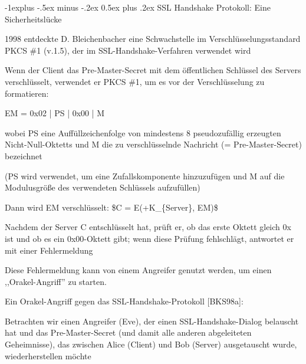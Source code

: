 \documentclass[a4paper]{article}
\makeatletter
\renewcommand{\subsection}{\@startsection{subsection}{2}{0mm}%
 {-1explus -.5ex minus -.2ex}%
 {0.5ex plus .2ex}%
 {\normalfont\normalsize\bfseries}}
\makeatother
\begin{document}
\begin{multicols}{3}
\begin{itemize*}
            \subsection{SSL Handshake Protokoll: Eine
                  Sicherheitslücke}
            \begin{itemize*}
                  \item       1998 entdeckte D. Bleichenbacher eine Schwachstelle im
                  Verschlüsselungsstandard PKCS \#1 (v.1.5), der im
                  SSL-Handshake-Verfahren verwendet wird
                  \item       Wenn der Client das Pre-Master-Secret mit dem öffentlichen Schlüssel
                  des Servers verschlüsselt, verwendet er PKCS \#1, um es vor der
                  Verschlüsselung zu formatieren:
                  \begin{itemize*}
                        \item EM = 0x02 | PS | 0x00 | M
                        \begin{itemize*} \item wobei PS eine Auffüllzeichenfolge von mindestens 8 pseudozufällig erzeugten Nicht-Null-Oktetts und M die zu verschlüsselnde Nachricht (= Pre-Master-Secret) bezeichnet \item (PS wird verwendet, um eine Zufallskomponente hinzuzufügen und M auf die Modulusgröße des verwendeten Schlüssels aufzufüllen) \end{itemize*}
                        \item Dann wird EM verschlüsselt: \$C = E(+K\_\{Server\}, EM)\$
                        \item Nachdem der Server C entschlüsselt hat, prüft er, ob das erste Oktett gleich 0x ist und ob es ein 0x00-Oktett gibt; wenn diese Prüfung fehlschlägt, antwortet er mit einer Fehlermeldung
                        \item Diese Fehlermeldung kann von einem Angreifer genutzt werden, um einen ,,Orakel-Angriff'' zu starten.
                  \end{itemize*}
                  \item       Ein Orakel-Angriff gegen das SSL-Handshake-Protokoll {[}BKS98a{]}:
                  \begin{itemize*}
                        \item Betrachten wir einen Angreifer (Eve), der einen SSL-Handshake-Dialog belauscht hat und das Pre-Master-Secret (und damit alle anderen abgeleiteten Geheimnisse), das zwischen Alice (Client) und Bob (Server) ausgetauscht wurde, wiederherstellen möchte

\end{itemize*}
\end{itemize*}
\end{itemize*}
\end{multicols}
\end{document}
